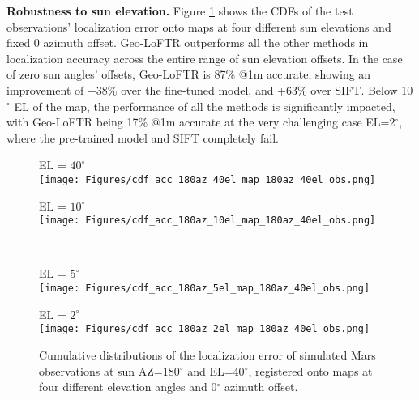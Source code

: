 \noindent \textbf{Robustness to sun elevation.} Figure \ref{fig:cdf_sun_el_var} shows the CDFs of the test observations' localization error onto maps at four different sun elevations and fixed 0 azimuth offset. Geo-LoFTR outperforms all the other methods in localization accuracy across the entire range of sun elevation offsets.
In the case of zero sun angles' offsets, Geo-LoFTR is 87\% @1m accurate, showing an improvement of +38\% over the fine-tuned model, and +63\% over SIFT. Below 10$^{\circ}$ EL of the map, the performance of all the methods is significantly impacted, with Geo-LoFTR being 17\% @1m accurate at the very challenging case EL=2$^{\circ}$, where the pre-trained model and SIFT completely fail.
\begin{figure}
\centering
\begin{minipage}[b]{0.49\linewidth}
    \centering
    EL = $40^{\circ}$
    \vspace{5pt} \\
    \texttt{[image: Figures/cdf\_acc\_180az\_40el\_map\_180az\_40el\_obs.png]}
\end{minipage}
\begin{minipage}[b]{0.49\linewidth}
    \centering
    EL = $10^{\circ}$
    \vspace{5pt} \\
    \texttt{[image: Figures/cdf\_acc\_180az\_10el\_map\_180az\_40el\_obs.png]}
\end{minipage}
\\
\vspace{10pt}
\begin{minipage}[b]{0.49\linewidth}
    \centering
    EL = $5^{\circ}$
    \vspace{5pt} \\
    \texttt{[image: Figures/cdf\_acc\_180az\_5el\_map\_180az\_40el\_obs.png]}
\end{minipage}
\begin{minipage}[b]{0.49\linewidth}
    \centering
    EL = $2^{\circ}$
    \vspace{5pt} \\
    \texttt{[image: Figures/cdf\_acc\_180az\_2el\_map\_180az\_40el\_obs.png]}
\end{minipage}
\vspace{-10pt}
\caption{\label{fig:cdf_sun_el_var}Cumulative distributions of the localization error of simulated Mars observations at sun AZ=180$^{\circ}$ and EL=40$^{\circ}$, registered onto maps at four different elevation angles and 0$^{\circ}$ azimuth offset.}
\end{figure}
